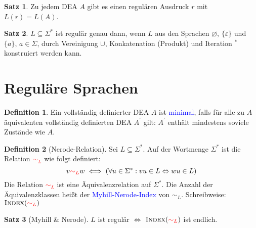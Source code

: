 \documentclass{scrreprt}
\theoremstyle{definition}
\newtheorem{Definition}{Definition}[section]
\newtheorem{Satz}{Satz}[section]
\theoremstyle{example}
\theoremstyle{algorithm}
\begin{document}
\begin{Satz}
Zu jedem DEA $A$ gibt es einen regulären Ausdruck $r$ mit ${L(r)=L(A)}$.
\end{Satz}

\begin{Satz}
$L\subseteq \Sigma^*$ ist regulär genau dann, wenn $L$ aus den Sprachen $\varnothing$, $\{\varepsilon\}$ und $\{a\}$, $a\in\Sigma$, durch Vereinigung $\cup$, Konkatenation (Produkt) und Iteration $^*$ konstruiert werden kann.
\end{Satz}

\section{Reguläre Sprachen}

\begin{Definition}
Ein vollständig definierter DEA $A$ ist \textcolor{blue}{minimal}, falls für alle zu $A$ äquivalenten vollständig definierten DEA $A^\prime$ gilt: $A^\prime$ enthält mindestens soviele Zustände wie $A$.
\end{Definition}

\begin{Definition}[Nerode-Relation]
Sei $L\subseteq\Sigma^*$. Auf der Wortmenge $\Sigma^*$ ist die Relation \textcolor{red}{$\sim_L$} wie folgt definiert:
\begin{equation*}
v \textcolor{red}{\sim_L} w \iff (\forall u \in \Sigma^*: vu \in L \Leftrightarrow wu\in L)
\end{equation*}
Die Relation \textcolor{red}{$\sim_L$} ist eine Äquivalenzrelation auf $\Sigma^*$. Die Anzahl der Äquivalenzklassen heißt der \textcolor{blue}{Myhill-Nerode-Index} von $\sim_L$. Schreibweise: \textcolor{blue}{$\textsc{Index}(\textcolor{red}{\sim_L})$}
\end{Definition}

\begin{Satz}[Myhill \& Nerode]
$L$ ist regulär $\iff$ $\textsc{Index}(\textcolor{red}{\sim_L})$ ist endlich.
\end{Satz}
\end{document}
